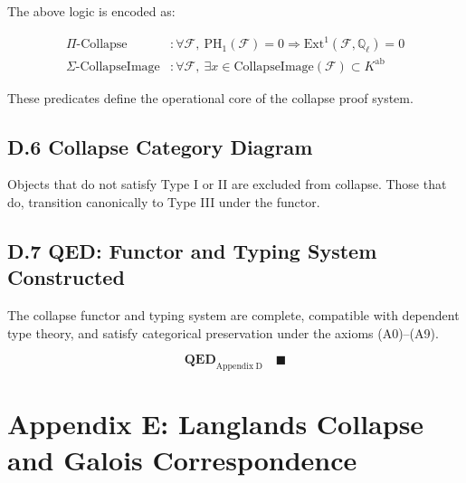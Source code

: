 \documentclass[11pt]{article}
\begin{document}
The above logic is encoded as:

\begin{align*}
\Pi\text{-Collapse} &: \forall \mathcal{F},\ \mathrm{PH}_1(\mathcal{F}) = 0 \Rightarrow \mathrm{Ext}^1(\mathcal{F}, \mathbb{Q}_\ell) = 0 \\
\Sigma\text{-CollapseImage} &: \forall \mathcal{F},\ \exists x \in \text{CollapseImage}(\mathcal{F}) \subset K^{\mathrm{ab}}
\end{align*}

These predicates define the operational core of the collapse proof system.

\subsection*{D.6 Collapse Category Diagram}

\begin{center}
\end{center}

Objects that do not satisfy Type I or II are excluded from collapse.  
Those that do, transition canonically to Type III under the functor.

\subsection*{D.7 QED: Functor and Typing System Constructed}

The collapse functor and typing system are complete, compatible with dependent type theory, and satisfy categorical preservation under the axioms (A0)–(A9).

\[
\textbf{QED}_{\mathrm{Appendix\ D}} \quad \blacksquare
\]



\appendix
\section*{Appendix E: Langlands Collapse and Galois Correspondence}
\end{document}
